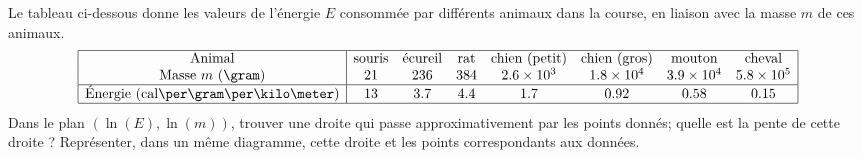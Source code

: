 \begin{exercice}\label{exoSC_serie3-0003}

	Le tableau ci-dessous donne les valeurs de l'énergie $E$ consommée par différents animaux dans la course, en liaison avec la masse $m$ de ces animaux.
	\[
		\begin{array}{|c|ccccccc|}
			\hline
			\text{Animal}& \text{souris}	&	\text{écureil}	&	\text{rat}	&	\text{chien (petit)}	&	\text{chien (gros)}	& \text{mouton}	&\text{cheval} \\
			\text{Masse $m$ (\gram)}& 21	& 236	&384&	2.6\times 10^3&	1.8\times 10^4	&	3.9\times 10^4	& 5.8\times 10^5 \\
			\hline
			\text{Énergie (cal\per\gram\per\kilo\meter)}& 13&	3.7&4.4&	1.7&	0.92&0.58&0.15\\
			\hline
		\end{array}
	\]
	Dans le plan $(\ln(E),\ln(m))$, trouver une droite qui passe approximativement par les points donnés; quelle est la pente de cette droite ? Représenter, dans un même diagramme, cette droite et les points correspondants aux données.

\end{exercice}
